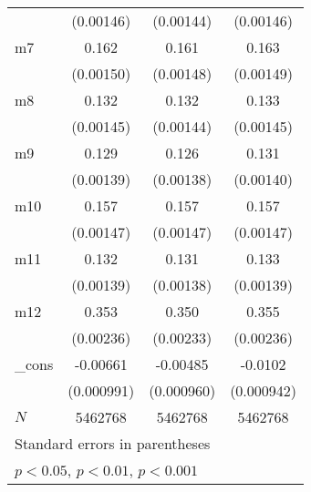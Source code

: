 {\begin{tabular}{l*{3}{c}}
            &   (0.00146)         &   (0.00144)         &   (0.00146)         \\
m7          &       0.162\sym{***}&       0.161\sym{***}&       0.163\sym{***}\\
            &   (0.00150)         &   (0.00148)         &   (0.00149)         \\
m8          &       0.132\sym{***}&       0.132\sym{***}&       0.133\sym{***}\\
            &   (0.00145)         &   (0.00144)         &   (0.00145)         \\
m9          &       0.129\sym{***}&       0.126\sym{***}&       0.131\sym{***}\\
            &   (0.00139)         &   (0.00138)         &   (0.00140)         \\
m10         &       0.157\sym{***}&       0.157\sym{***}&       0.157\sym{***}\\
            &   (0.00147)         &   (0.00147)         &   (0.00147)         \\
m11         &       0.132\sym{***}&       0.131\sym{***}&       0.133\sym{***}\\
            &   (0.00139)         &   (0.00138)         &   (0.00139)         \\
m12         &       0.353\sym{***}&       0.350\sym{***}&       0.355\sym{***}\\
            &   (0.00236)         &   (0.00233)         &   (0.00236)         \\
\_cons      &    -0.00661\sym{***}&    -0.00485\sym{***}&     -0.0102\sym{***}\\
            &  (0.000991)         &  (0.000960)         &  (0.000942)         \\
\hline
\(N\)       &     5462768         &     5462768         &     5462768         \\
\hline\hline
\multicolumn{4}{l}{\footnotesize Standard errors in parentheses}\\
\multicolumn{4}{l}{\footnotesize \sym{*} \(p<0.05\), \sym{**} \(p<0.01\), \sym{***} \(p<0.001\)}\\
\end{tabular}
}
